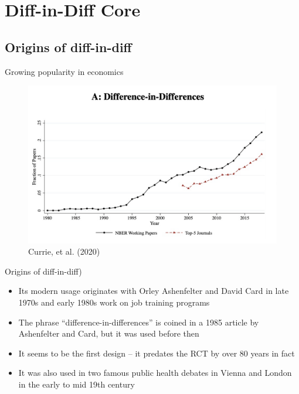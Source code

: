 \documentclass{beamer}
\begin{document}
\section{Diff-in-Diff Core}


\subsection{Origins of diff-in-diff}


\begin{frame}{Growing popularity in economics}

	\begin{figure}
	\caption{Currie, et al. (2020)}
	\includegraphics[scale=0.25]{./lecture_includes/currie_did.png}
	\end{figure}

\bigskip

\footnotesize


\end{frame}

\begin{frame}{Origins of diff-in-diff)}

\begin{itemize}
\item Its modern usage originates with Orley Ashenfelter and David Card in late 1970s and early 1980s work on job training programs
\item The phrase ``difference-in-differences'' is coined in a 1985 article by Ashenfelter and Card, but it was used before then
\item It seems to be the first design -- it predates the RCT by over 80 years in fact
\item It was also used in two famous public health debates in Vienna and London in the early to mid 19th century

\end{itemize}
\end{frame}
\end{document}
